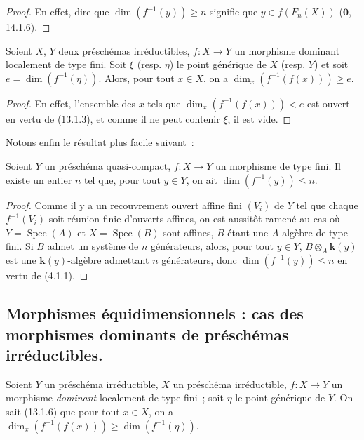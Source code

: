 \begin{proof}
En effet, dire que $\dim(f^{-1}(y))\geq n$ signifie que $y\in f(F_n(X))$
($\mathbf 0$, 14.1.6).
\end{proof}

\begin{corollary}[13.1.6]
\label{IV.13.1.6-fr}
Soient $X$, $Y$ deux préschémas irréductibles, $f:X\to Y$ un morphisme
dominant localement de type fini. Soit $\xi$ \textup{(resp. $\eta$)} le point générique
de $X$ \textup{(resp. $Y$)} et soit $e=\dim(f^{-1}(\eta))$. Alors, pour tout $x\in X$,
on a $\dim_x(f^{-1}(f(x)))\geq e$.
\end{corollary}

\begin{proof}
En effet, l'ensemble des $x$ tels que $\dim_x(f^{-1}(f(x)))<e$ est ouvert en
vertu de (13.1.3), et comme il ne peut contenir $\xi$, il est vide.
\end{proof}

Notons enfin le résultat plus facile suivant~:

\begin{proposition}[13.1.7]
\label{IV.13.1.7-fr}
Soient $Y$ un préschéma quasi-compact, $f:X\to Y$ un morphisme de type fini.
Il existe un entier $n$ tel que, pour tout $y\in Y$, on ait
$\dim(f^{-1}(y))\leq n$.
\end{proposition}

\begin{proof}
Comme il y a un recouvrement ouvert affine fini $(V_i)$ de $Y$ tel que chaque
$f^{-1}(V_i)$ soit réunion finie d'ouverts affines, on est aussitôt ramené au
cas où $Y=\operatorname{Spec}(A)$ et $X=\operatorname{Spec}(B)$ sont affines,
$B$ étant une $A$-algèbre de type fini. Si $B$ admet un système de $n$
générateurs, alors, pour tout $y\in Y$, $B\otimes_A\boldsymbol{k}(y)$ est une
$\boldsymbol{k}(y)$-algèbre admettant $n$ générateurs, donc $\dim(f^{-1}(y))\leq n$ en
vertu de (4.1.1).
\end{proof}

\subsection{Morphismes équidimensionnels : cas des morphismes dominants de préschémas irréductibles.}
\label{subsection:IV.13.2-fr}

\begin{env}[13.2.1]
\label{IV.13.2.1-fr}
Soient $Y$ un préschéma irréductible, $X$ un préschéma irréductible,
$f:X\to Y$ un morphisme \emph{dominant} localement de type fini~; soit $\eta$ le
point générique de $Y$. On sait (13.1.6) que pour tout $x\in X$, on a
$\dim_x(f^{-1}(f(x)))\geq\dim(f^{-1}(\eta))$.
\end{env}

